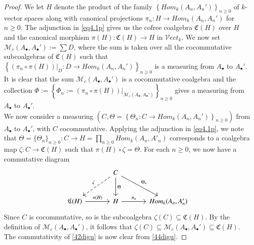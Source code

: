 \documentclass[10pt, colorlinks]{article}
\numberwithin{equation}{section} \DeclareMathSizes{2}{10}{12}{13}
\begin{document}
    
    \begin{proof}
        We let $H$ denote the product of the family $\left\{ {Hom}_k(A_n,A_n')\right\}_{n\geq 0}$ of $k$-vector spaces along with canonical projections $\pi_n:H\longrightarrow  {Hom}_k(A_n,A_n')$ for $n\geq 0$.  The adjunction in \eqref{eq4.1p} gives us the   cofree coalgebra $\mathfrak C(H)$ over $H$ and the canonical morphism $\pi(H):\mathfrak C(H)\longrightarrow H$ in $\mathcal Vect_k$. We now set $\mathcal M_c(A_\bullet, A_\bullet'):=\sum D$, where the sum is taken over all the cocommutative subcoalgebras of $\mathfrak C(H)$ such that $\left\{(\pi_n\circ\pi(H))\big|_D: D\longrightarrow Hom_k(A_n, A_n')\right\}_{n\geq 0}$ is a measuring from $A_\bullet$ to $A_\bullet'$.  It is clear that  the sum $\mathcal M_c(A_\bullet, A_\bullet')$ is a cocommutative coalgebra and the collection $\Phi:=\left\{\Phi_n:=(\pi_n\circ\pi(H))\big|_{\mathcal M_c(A_\bullet, A_\bullet')}\right\}_{n\geq 0}$   gives a measuring from $A_\bullet$ to $A_\bullet'$.\\
        
       We now consider a measuring $\left(C,\Theta=\left\{\Theta_n: C\longrightarrow Hom_k(A_n,A_n')\right\}_{n\geq 0}\right)$ from $A_\bullet$ to $A_\bullet'$, with $C$ cocommutative. Applying the adjunction in \eqref{eq4.1p}, we note that  $\Theta=\{\Theta_n\}_{n\geq 0}:C\longrightarrow H=\underset{n\geq 0}{\prod}Hom_k(A_n,A'_n)$  corresponds to a coalgebra map $\zeta: C\longrightarrow \mathfrak C(H)$ such that $\pi(H)\circ \zeta=\Theta$. For each $n\geq 0$, we now have a commutative diagram
        \begin{equation}\label{44digu}
        \begin{array}{c}
\begin{tikzcd}[column sep=large, row sep=large]
& C \arrow[dl, dashed, "\zeta"'] 
    \arrow[d, "\Theta"] 
    \arrow[dr, "{\Theta_n}"] & \\
\mathfrak C(H) \arrow[r, "\pi(H)"] 
& H \arrow[r, "\pi_n"] 
& { {Hom}}_k(A_n,A_n')
\end{tikzcd}
\end{array}
\end{equation}
         Since $C$ is cocommutative, so is the subcoalgebra $\zeta(C)\subseteq \mathfrak C(H)$. By the definition of $\mathcal M_c(A_\bullet, A_\bullet')$, it follows that 
         $\zeta(C)\subseteq \mathcal M_c(A_\bullet, A_\bullet')\subseteq \mathfrak C(H)$. The commutativity of \eqref{42digu} is now clear from \eqref{44digu}. 
    \end{proof}
\end{document}
